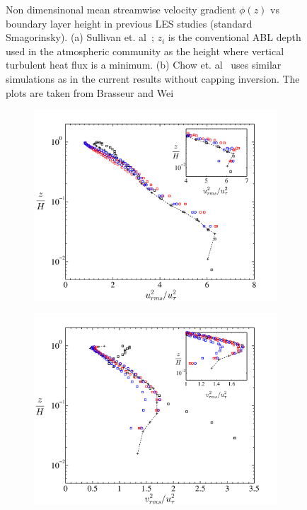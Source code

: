 \begin{figure}
\begin{subfigure}[t]{0.475\textwidth}
                \caption{}
                \label{fig:phi2}
        \end{subfigure}%
        \caption[Law of Wall: Previous studies]{Non dimensinonal mean streamwise velocity gradient $\phi(z)$ vs boundary layer height in previous LES studies (standard Smagorinsky). (a) Sullivan et. al~\cite{sull}; $z_i$ is the conventional ABL depth used {in the} atmospheric community as the height where vertical turbulent heat flux is a minimum. (b) Chow et. al~\cite{chow} uses similar simulations as in the current results without capping inversion. The plots are taken from Brasseur and Wei~\cite{brass}}\label{fig:sulchow}
\end{figure}
\begin{figure}
\centering
        \begin{subfigure}[t]{0.75\textwidth}
                \includegraphics[width=\linewidth]{Fig3/urms_filter_n2.pdf}
                \caption{}
                \label{fig:urms}
        \end{subfigure}
        \centering
        \begin{subfigure}[t]{0.75\textwidth}
                \includegraphics[width=\linewidth]{Fig3/vrms_filter_n2.pdf}

\end{subfigure}
\end{figure}
